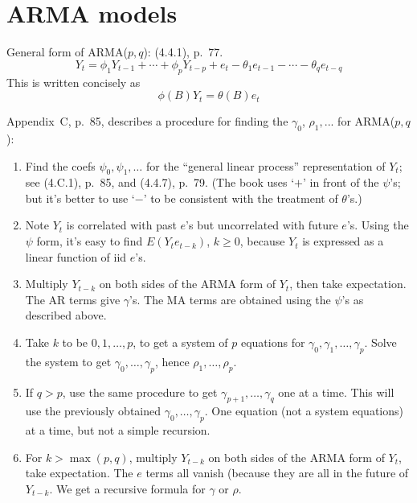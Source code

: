 \documentclass[12pt]{article}
\begin{document}
\section{ARMA models}

General form of ARMA($p,q$): (4.4.1), p.~77.
\[
Y_t = \phi_1 Y_{t-1} + \dotsb + \phi_p Y_{t-p}
    + e_{t} - \theta_1 e_{t-1} - \dotsb - \theta_q e_{t-q}
\]
This is written concisely as
\[
\phi(B) Y_t = \theta(B) e_t
\]


Appendix~C, p.~85, describes a procedure
for finding the $\gamma_0$, $\rho_1,...$ for ARMA($p,q$):
\begin{enumerate}
\item Find the coefs $\psi_0,\psi_1,\dotsc$ for the ``general linear
process'' representation of $Y_t$; see (4.C.1), p.~85, and (4.4.7),
p.~79. (The book uses `$+$' in front of the $\psi$'s;
but it's better to use `$-$' to be consistent with the treatment of
$\theta$'s.)
\item Note $Y_t$ is correlated with past $e$'s but uncorrelated with
future $e$'s.
Using the $\psi$ form, it's easy to find
$E(Y_t e_{t-k})$, $k\ge 0$, because $Y_t$ is expressed as a linear
function of iid $e$'s.
\item Multiply $Y_{t-k}$ on both sides of the ARMA form of $Y_t$, then
take expectation.
The AR terms give $\gamma$'s.
The MA terms are obtained using the $\psi$'s as described above.
\item Take $k$ to be $0,1,\dotsc,p$,
to get a system of $p$ equations
for $\gamma_0, \gamma_1,\dotsc, \gamma_p$.
Solve the system to get
$\gamma_0,\dotsc, \gamma_p$, hence $\rho_1,\dotsc,\rho_p$.
\item If $q > p$, use the same procedure to get
$\gamma_{p+1},\dotsc,\gamma_{q}$ one at a time.
This will use the previously obtained $\gamma_0,\dotsc,\gamma_p$.
One equation (not a system equations) at a time, but not a simple
recursion.
\item For $k>\max(p,q)$, multiply $Y_{t-k}$ on both sides of the ARMA form of
$Y_t$, take expectation. The $e$ terms all vanish (because they are all
in the future of $Y_{t-k}$. We get a recursive formula for $\gamma$ or
$\rho$.
\end{enumerate}


% 
\end{document}
